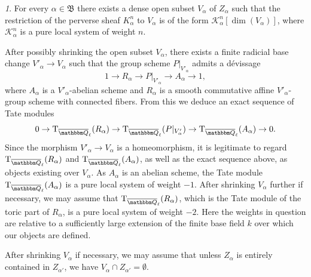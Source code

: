 \documentclass[12pt,english]{smfart}
\numberwithin{equation}{subsection}
\theoremstyle{remark}
\newtheorem{numero}[equation]{}
\newcommand\calK{{\mathcal K}}
\newcommand\rmT{{\rm T}}
\newcommand\FrakB{{\mathfrak B}}
\newcommand\QQ{{\mathbbm Q}}
\newcommand\Ql{{\overline\QQ_\ell}}
\begin{document}
\begin{numero}\label{ouvert V alpha}
For every $\alpha\in\FrakB$ there exists a dense open subset $V_\alpha$ of $Z_\alpha$ such that the restriction of the perverse sheaf $K^n_\alpha$ to $V_\alpha$ is of the form $\calK^n_\alpha[\dim(V_\alpha)]$, where $\calK^n_\alpha$ is a pure local system of weight $n$.

After possibly shrinking the open subset $V_\alpha$, there exists a finite radicial base change $V'_\alpha\rightarrow V_\alpha$ such that the group scheme $P|_{V'_\alpha}$ admits a d\'evissage
$$1\rightarrow R_\alpha \rightarrow P|_{V'_\alpha}\rightarrow A_\alpha \rightarrow 1,$$
where $A_\alpha$ is a $V'_\alpha$-abelian scheme and $R_\alpha$ is a smooth commutative affine $V'_\alpha$-group scheme with connected fibers. From this we deduce an exact sequence of Tate modules
$$0\rightarrow \rmT_\Ql(R_\alpha)\rightarrow \rmT_\Ql(P|_{V'_\alpha})\rightarrow \rmT_\Ql(A_\alpha)\rightarrow 0.$$
Since the morphism $V'_\alpha\rightarrow V_\alpha$ is a homeomorphism, it is legitimate to regard $\rmT_\Ql(R_\alpha)$ and $\rmT_\Ql(A_\alpha)$, as well as the exact sequence above, as objects existing over $V_\alpha$. As $A_\alpha$ is an abelian scheme, the Tate module $\rmT_\Ql(A_\alpha)$ is a pure local system of weight $-1$. After shrinking $V_\alpha$ further if necessary, we may assume that $\rmT_\Ql(R_\alpha)$, which is the Tate module of the toric part of $R_\alpha$, is a pure local system of weight $-2$. Here the weights in question are relative to a sufficiently large extension of the finite base field $k$ over which our objects are defined.

After shrinking $V_\alpha$ if necessary, we may assume that unless $Z_\alpha$ is entirely contained in $Z_{\alpha'}$, we have $V_\alpha\cap Z_{\alpha'}=\emptyset$.
\end{numero}
\end{document}
